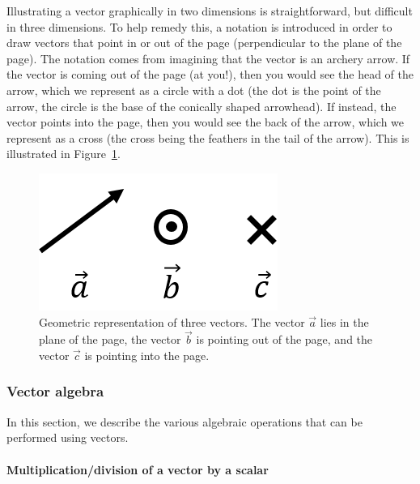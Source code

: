 Illustrating a vector graphically in two dimensions is straightforward, but difficult in three dimensions. To help remedy this, a notation is introduced in order to draw vectors that point in or out of the page (perpendicular to the plane of the page). The notation comes from imagining that the vector is an archery arrow. If the vector is coming out of the page (at you!), then you would see the head of the arrow, which we represent as a circle with a dot (the dot is the point of the arrow, the circle is the base of the conically shaped arrowhead). If instead, the vector points into the page, then you would see the back of the arrow, which we represent as a cross (the cross being the feathers in the tail of the arrow). This is illustrated in Figure~\ref{fig:Vectors:vector3d}.

\begin{figure}[!htbp]
\centering
\includegraphics[width=0.375\linewidth]{files/vector3d-3bea86fda2d25a5ff5ca79d247637439.png}
\caption[]{Geometric representation of three vectors. The vector $\vec a$ lies in the plane of the page, the vector $\vec b$ is pointing out of the page, and the vector $\vec c$ is pointing into the page.}
\label{fig:Vectors:vector3d}
\end{figure}

\subsubsection{Vector algebra}

In this section, we describe the various algebraic operations that can be performed using vectors.

\paragraph{Multiplication/division of a vector by a scalar}


